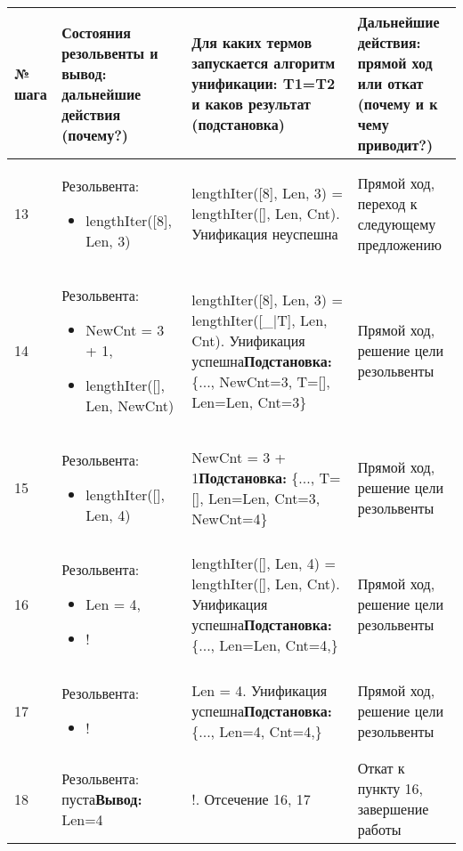 \documentclass[14pt,a4paper]{scrreprt}
\begin{document}
\begin{table}[H]
	\begin{tabular}{|p{0.8cm\small}|p{4.7cm\small}|p{5.7cm\small}|p{4cm\small}|}	
		\hline
		№ шага & Состояния резольвенты и вывод: дальнейшие действия (почему?) & Для каких термов запускается алгоритм унификации: T1=T2 и каков результат (подстановка) & Дальнейшие действия: прямой ход или откат (почему и к чему приводит?)\\
		\hline
		13 & Резольвента: \begin{itemize} \item lengthIter([8], Len, 3) \end{itemize} & lengthIter([8], Len, 3) = lengthIter([], Len, Cnt). Унификация неуспешна & Прямой ход, переход к следующему предложению\\
		\hline
		14 & Резольвента: \begin{itemize} \item NewCnt = 3 + 1, \item lengthIter([], Len, NewCnt) \end{itemize} & lengthIter([8], Len, 3) = lengthIter([\_|T], Len, Cnt). Унификация успешна\linebreak \textbf{Подстановка:} \{..., NewCnt=3, T=[], Len=Len, Cnt=3\} & Прямой ход, решение цели резольвенты \\
		\hline
		15 & Резольвента: \begin{itemize} \item lengthIter([], Len, 4) \end{itemize} & NewCnt = 3 + 1\linebreak \textbf{Подстановка:} \{..., T=[], Len=Len, Cnt=3, NewCnt=4\} & Прямой ход, решение цели резольвенты \\
		\hline
		16 & Резольвента: \begin{itemize} \item  Len = 4, \item ! \end{itemize} & lengthIter([], Len, 4) = lengthIter([], Len, Cnt). Унификация успешна\linebreak \textbf{Подстановка:} \{..., Len=Len, Cnt=4,\} & Прямой ход, решение цели резольвенты \\
		\hline
		17 & Резольвента: \begin{itemize} \item ! \end{itemize} & Len = 4. Унификация успешна\linebreak \textbf{Подстановка:} \{..., Len=4, Cnt=4,\} & Прямой ход, решение цели резольвенты \\
		\hline
		18 & Резольвента: пуста\linebreak \textbf{Вывод:} Len=4 & !. Отсечение 16, 17 & Откат к пункту 16, завершение работы\\
		\hline
	\end{tabular}
\end{table}
		
\end{document}
